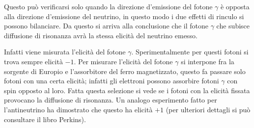 Questo può verificarsi solo quando la direzione d'emissione del fotone 
$\gamma$ è opposta alla direzione d'emissione del neutrino, in questo modo
i due effetti di rinculo si possono bilanciare. Da questo si arriva alla 
conclusione che il fotone $\gamma$ che subisce diffusione di risonanza avrà la 
stessa elicità del neutrino
emesso.
\begin{figure}[!htbp]
\centering
\caption{}
\end{figure}

Infatti viene misurata l'elicità del fotone $\gamma$. Sperimentalmente per 
questi fotoni si trova sempre elicità $-1$. Per misurare l'elicità del fotone 
$\gamma$ si interpone
fra la sorgente di Europio e l'assorbitore del ferro magnetizzato, questo fa 
passare solo fotoni con una certa elicità; infatti gli elettroni possono 
assorbire fotoni $\gamma$
con spin opposto al loro. Fatta questa selezione si vede se i fotoni con la 
elicità fissata provocano la diffusione di risonanza.
Un analogo esperimento fatto per l'antineutrino ha dimostrato che questo ha 
elicità $+1$ (per ulteriori dettagli si può consultare il libro Perkins).

